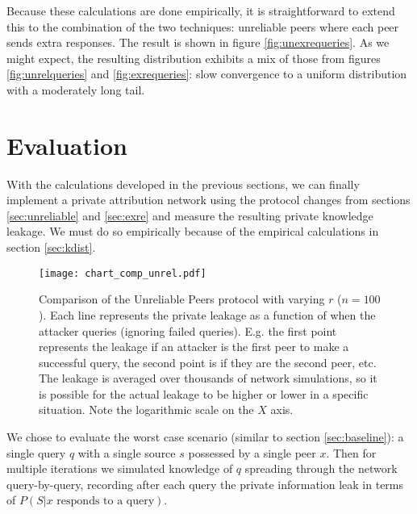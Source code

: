 \documentclass{article}
\newcommand{\secref}[1]{section \ref{sec:#1}}
\newcommand{\figref}[1]{figure \ref{fig:#1}}
\begin{document}
Because these calculations are done empirically, it is straightforward to extend this to
the combination of the two techniques: unreliable peers where each peer sends
extra responses. The result is shown in \figref{unexrequeries}. As we might expect, the
resulting distribution exhibits a mix of those from figures
\ref{fig:unrelqueries}
and \ref{fig:exrequeries}: slow convergence to a uniform distribution with a moderately
long tail.


\section{Evaluation}\label{sec:eval}

With the calculations developed in the previous sections, we can finally
implement a private attribution network using the protocol changes from sections
\ref{sec:unreliable} and \ref{sec:exre} and measure the resulting private
knowledge leakage. We must do so empirically because of the empirical
calculations in \secref{kdist}.

\begin{figure}%
    \centering
	\texttt{[image: chart\_comp\_unrel.pdf]}
	\caption{Comparison of the Unreliable Peers protocol with varying $r$
	($n=100$). Each line represents the private leakage as a function of when
	the attacker queries (ignoring failed queries). E.g. the first point
	represents the leakage if an attacker is the first peer to make a successful
	query, the second point is if they are the second peer, etc. The leakage is
	averaged over thousands of network simulations, so it is possible for the
	actual leakage to be higher or lower in a specific situation. Note the
	logarithmic scale on the $X$ axis.}
    \label{fig:compunrel}%
\end{figure}

We chose to evaluate the worst case scenario (similar to \secref{baseline}): a
single query $q$ with a single source $s$ possessed by a single peer $x$. Then
for multiple iterations we simulated knowledge of $q$ spreading through the
network query-by-query, recording after each query the private information leak
in terms of $P(S|\text{$x$ responds to a query})$.
\end{document}
